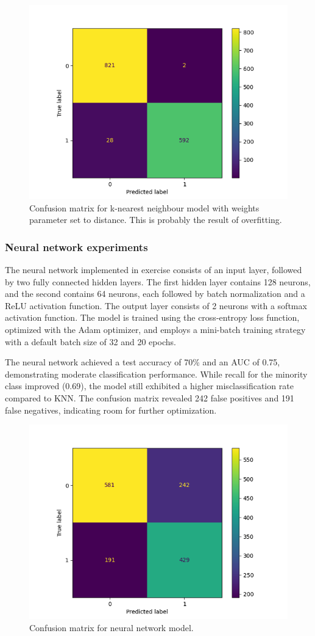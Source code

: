 \begin{figure}[H]
	\centering
	\includegraphics[width=0.7\linewidth]{img/knn_cm_distance}
	\caption{Confusion matrix for k-nearest neighbour model with weights parameter set to distance. This is probably the result of overfitting.}
	\label{fig:knncmdistance}
\end{figure}

\bigskip
\subsubsection{Neural network experiments}

The neural network implemented in exercise consists of an input layer, followed by two fully connected hidden layers. The first hidden layer contains 128 neurons, and the second contains 64 neurons, each followed by batch normalization and a ReLU activation function. The output layer consists of 2 neurons with a softmax activation function. The model is trained using the cross-entropy loss function, optimized with the Adam optimizer, and employs a mini-batch training strategy with a default batch size of 32 and 20 epochs.

The neural network achieved a test accuracy of 70\% and an AUC of 0.75, demonstrating moderate classification performance. While recall for the minority class improved (0.69), the model still exhibited a higher misclassification rate compared to KNN. The confusion matrix revealed 242 false positives and 191 false negatives, indicating room for further optimization.


\begin{figure}[H]
	\centering
	\includegraphics[width=0.7\linewidth]{img/nn_cm}
	\caption{Confusion matrix for neural network model.}
	\label{fig:nncm}
\end{figure}

